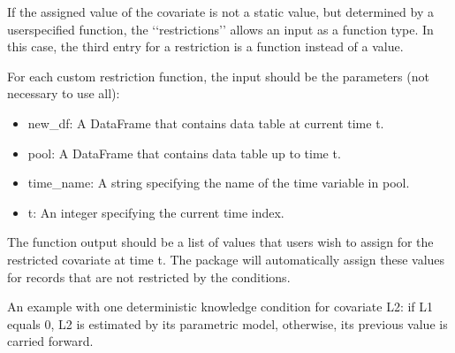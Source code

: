 \documentclass[letterpaper,10pt,english]{sphinxmanual}
\begin{document}
\sphinxAtStartPar
If the assigned value of the covariate is not a static value, but determined by a user\sphinxhyphen{}specified function,
the ‘‘restrictions’’ allows an input as a function type. In this case, the third entry for a restriction is a function
instead of a value.

\sphinxAtStartPar
For each custom restriction function, the input should be the parameters (not necessary to use all):
\begin{itemize}
\item {} 
\sphinxAtStartPar
new\_df: A DataFrame that contains data table at current time t.

\item {} 
\sphinxAtStartPar
pool: A DataFrame that contains data table up to time t.

\item {} 
\sphinxAtStartPar
time\_name: A string specifying the name of the time variable in pool.

\item {} 
\sphinxAtStartPar
t: An integer specifying the current time index.

\end{itemize}

\sphinxAtStartPar
The function output should be a list of values that users wish to assign for the restricted covariate at time t.
The package will automatically assign these values for records that are not restricted by the conditions.

\sphinxAtStartPar
An example with one deterministic knowledge condition for covariate L2: if L1 equals 0, L2 is estimated
by its parametric model, otherwise, its previous value is carried forward.

\begin{sphinxVerbatim}[commandchars=\\\{\}]
    
      \PYG{p}{[}\PYG{p}{[}\PYG{p}{]}   \PYG{p}{]}
     

  \PYG{p}{[}\PYG{p}{[}       \PYG{p}{]}\PYG{p}{]}
      
\end{sphinxVerbatim}
\end{document}

